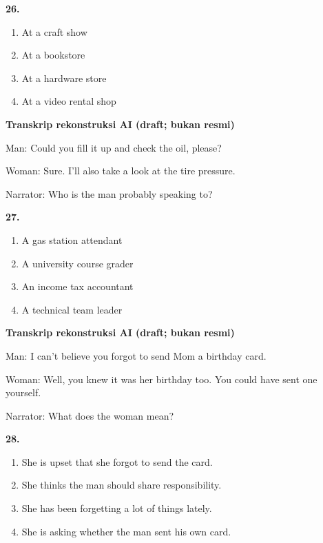 \documentclass[12pt]{article}
\begin{document}
\noindent\textbf{26.}
\begin{enumerate}[label=(\Alph*),leftmargin=*,itemsep=0.2em]
\item At a craft show
\item At a bookstore
\item At a hardware store
\item At a video rental shop
\end{enumerate}
\par
\vspace{0.25\baselineskip}
\begin{exampleblock}
\textbf{Transkrip rekonstruksi AI (draft; bukan resmi)}\par
Man: Could you fill it up and check the oil, please?\par
Woman: Sure. I'll also take a look at the tire pressure.\par
Narrator: Who is the man probably speaking to?\par
\end{exampleblock}
\noindent\textbf{27.}
\begin{enumerate}[label=(\Alph*),leftmargin=*,itemsep=0.2em]
\item A gas station attendant
\item A university course grader
\item An income tax accountant
\item A technical team leader
\end{enumerate}
\par
\vspace{0.25\baselineskip}
\begin{exampleblock}
\textbf{Transkrip rekonstruksi AI (draft; bukan resmi)}\par
Man: I can't believe you forgot to send Mom a birthday card.\par
Woman: Well, you knew it was her birthday too. You could have sent one yourself.\par
Narrator: What does the woman mean?\par
\end{exampleblock}
\noindent\textbf{28.}
\begin{enumerate}[label=(\Alph*),leftmargin=*,itemsep=0.2em]
\item She is upset that she forgot to send the card.
\item She thinks the man should share responsibility.
\item She has been forgetting a lot of things lately.
\item She is asking whether the man sent his own card.
\end{enumerate}
\end{document}
